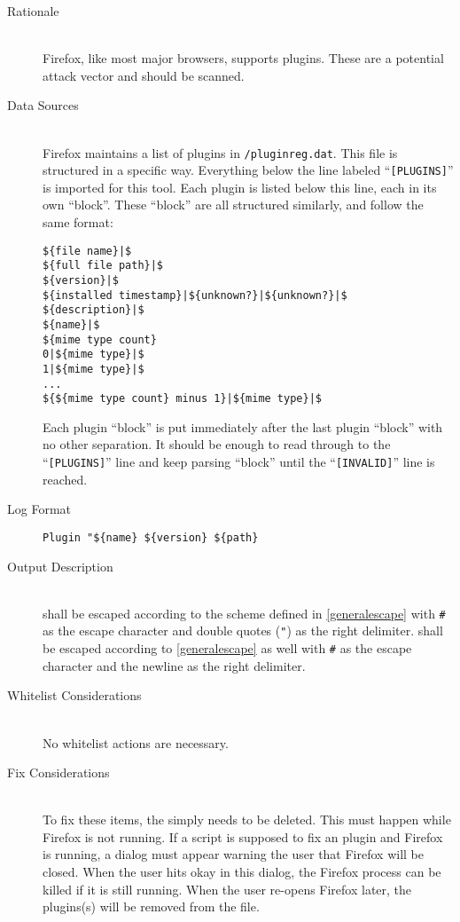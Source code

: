 \begin{description}
\item[Rationale] \hfill \\
Firefox, like most major browsers, supports plugins.  These are a potential
attack vector and should be scanned.  
\item[Data Sources] \hfill \\
Firefox maintains a list of plugins in \texttt{/pluginreg.dat}.
This file is structured in a specific way.  Everything below the line labeled
``\texttt{[PLUGINS]}'' is imported for this tool.  Each plugin is listed below
this line, each in its own ``block''.  These ``block'' are all structured
similarly, and follow the same format:
\begin{verbatim}
${file name}|$
${full file path}|$
${version}|$
${installed timestamp}|${unknown?}|${unknown?}|$
${description}|$
${name}|$
${mime type count}
0|${mime type}|$
1|${mime type}|$
...
${${mime type count} minus 1}|${mime type}|$
\end{verbatim}
Each plugin ``block'' is put immediately after the last plugin ``block'' with no
other separation.  It should be enough to read through to the
``\texttt{[PLUGINS]}'' line and keep parsing ``block'' until the
``\texttt{[INVALID]}'' line is reached.
\item[Log Format] \hfill 
\vspace{-\baselineskip}
\begin{verbatim}
Plugin "${name} ${version} ${path}
\end{verbatim}
\item[Output Description] \hfill \\
 shall be escaped according to the scheme
defined in \ref{generalescape} with \verb|#| as the escape character and double
quotes (\verb|"|) as the right delimiter.   shall be escaped
according to \ref{generalescape} as well with \verb|#| as the escape character
and the newline as the right delimiter.  
\item[Whitelist Considerations] \hfill \\
No whitelist actions are necessary.  
\item[Fix Considerations] \hfill \\
To fix these items, the  simply needs to be deleted.  This must
happen while Firefox is not running.  If a script is supposed to fix an
plugin and Firefox is running, a dialog must appear warning the user that
Firefox will be closed.  When the user hits okay in this dialog, the Firefox
process can be killed if it is still running.  When the user re-opens Firefox
later, the plugins(s) will be removed from the file.
\end{description}

